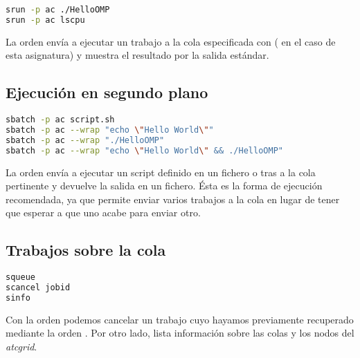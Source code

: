 \begin{lstlisting}[language=sh]
srun -p ac ./HelloOMP
srun -p ac lscpu
\end{lstlisting}

La orden  envía a ejecutar un trabajo a la cola especificada con  ( en el caso de esta asignatura) y muestra el resultado por la salida estándar.

\subsection{Ejecución en segundo plano}

\begin{lstlisting}[language=sh]
sbatch -p ac script.sh
sbatch -p ac --wrap "echo \"Hello World\""
sbatch -p ac --wrap "./HelloOMP"
sbatch -p ac --wrap "echo \"Hello World\" && ./HelloOMP"
\end{lstlisting}

La orden  envía a ejecutar un script definido en un fichero o tras  a la cola pertinente y devuelve la salida en un fichero.
Ésta es la forma de ejecución recomendada, ya que permite enviar varios trabajos a la cola en lugar de tener que esperar a que uno acabe para enviar otro.

\subsection{Trabajos sobre la cola}

\begin{lstlisting}[language=sh]
squeue
scancel jobid
sinfo
\end{lstlisting}

Con la orden  podemos cancelar un trabajo cuyo  hayamos previamente recuperado mediante la orden .
Por otro lado,  lista información sobre las colas y los nodos del \textit{atcgrid}.
